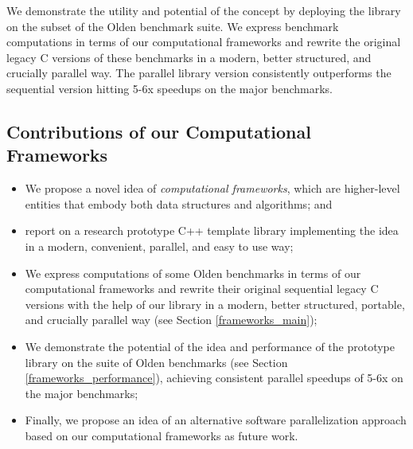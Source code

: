 \quad We demonstrate the utility and potential of the concept by deploying the library on the subset of the Olden benchmark suite. We express benchmark computations in terms of our computational frameworks and rewrite the original legacy C versions of these benchmarks in a modern, better structured, and crucially parallel way. The parallel library version consistently outperforms the sequential version hitting 5-6x speedups on the major benchmarks.\newline\null
\subsection{Contributions of our Computational Frameworks}
\begin{itemize}[style=unboxed,leftmargin=0cm]
\itemsep0em
\renewcommand\labelitemi{$\vartriangleright$}
\renewcommand\labelitemii{$\bullet$}
\item We propose a novel idea of \textit{computational frameworks}, which are higher-level entities that embody both data structures and algorithms; and
\item report on a research prototype C++ template library \cite{frameworks-repo} implementing the idea in a modern, convenient, parallel, and easy to use way;
\item We express computations of some Olden benchmarks in terms of our computational frameworks and rewrite their original sequential legacy C versions with the help of our library in a modern, better structured, portable, and crucially parallel way (see Section \ref{frameworks_main});
\item We demonstrate the potential of the idea and performance of the prototype library on the suite of Olden benchmarks (see Section \ref{frameworks_performance}), achieving consistent parallel speedups of 5-6x on the major benchmarks;
\item Finally, we propose an idea of an alternative software parallelization approach based on our computational frameworks as future work.
\end{itemize}

%